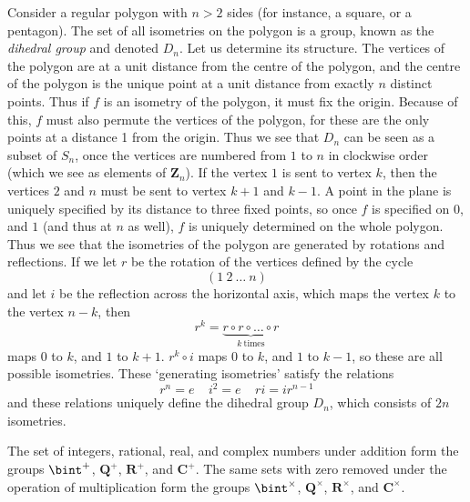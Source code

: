 \begin{example}
    Consider a regular polygon with $n > 2$ sides (for instance, a square, or a pentagon). The set of all isometries on the polygon is a group, known as the \emph{dihedral group} and denoted $D_n$. Let us determine its structure. The vertices of the polygon are at a unit distance from the centre of the polygon, and the centre of the polygon is the unique point at a unit distance from exactly $n$ distinct points. Thus if $f$ is an isometry of the polygon, it must fix the origin. Because of this, $f$ must also permute the vertices of the polygon, for these are the only points at a distance 1 from the origin. Thus we see that $D_n$ can be seen as a subset of $S_n$, once the vertices are numbered from $1$ to $n$ in clockwise order (which we see as elements of $\mathbf{Z}_n$). If the vertex $1$ is sent to vertex $k$, then the vertices $2$ and $n$ must be sent to vertex $k+1$ and $k-1$. A point in the plane is uniquely specified by its distance to three fixed points, so once $f$ is specified on $0$, and $1$ (and thus at $n$ as well), $f$ is uniquely determined on the whole polygon. Thus we see that the isometries of the polygon are generated by rotations and reflections. If we let $r$ be the rotation of the vertices defined by the cycle
    \[ (1\ 2\ \dots\ n) \]
    and let $i$ be the reflection across the horizontal axis, which maps the vertex $k$ to the vertex $n - k$, then
    \[ r^k = \underbrace{r \circ r \circ \dots \circ r}_{k\ \text{times}} \]
    maps $0$ to $k$, and $1$ to $k+1$. $r^k \circ i$ maps $0$ to $k$, and $1$ to $k-1$, so these are all possible isometries. These `generating isometries' satisfy the relations
    \[ r^n = e\ \ \ \ \ i^2 = e\ \ \ \ \ ri = ir^{n-1} \]
    and these relations uniquely define the dihedral group $D_n$, which consists of $2n$ isometries.
\end{example}

\begin{example}
    The set of integers, rational, real, and complex numbers under addition form the groups $\bint^+$, $\mathbf{Q}^+$, $\mathbf{R}^+$, and $\mathbf{C}^+$. The same sets with zero removed under the operation of multiplication form the groups $\bint^\times$, $\mathbf{Q}^\times$, $\mathbf{R}^\times$, and $\mathbf{C}^\times$.
\end{example}